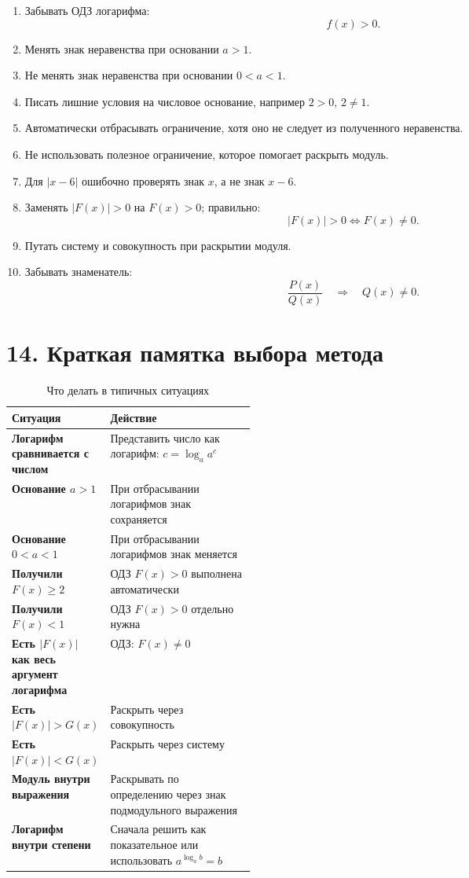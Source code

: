 \documentclass[a4paper,12pt]{article}
\newcommand{\sectionline}{\vspace{0.35em}{\color{accent}\hrule height 0.6pt}\vspace{0.65em}}
\begin{document}
\begin{enumerate}
    \item Забывать ОДЗ логарифма:
    \[
    f(x)>0.
    \]
    \item Менять знак неравенства при основании $a>1$.
    \item Не менять знак неравенства при основании $0<a<1$.
    \item Писать лишние условия на числовое основание, например $2>0$, $2\ne1$.
    \item Автоматически отбрасывать ограничение, хотя оно не следует из полученного неравенства.
    \item Не использовать полезное ограничение, которое помогает раскрыть модуль.
    \item Для $|x-6|$ ошибочно проверять знак $x$, а не знак $x-6$.
    \item Заменять $|F(x)|>0$ на $F(x)>0$; правильно:
    \[
    |F(x)|>0\Longleftrightarrow F(x)\ne0.
    \]
    \item Путать систему и совокупность при раскрытии модуля.
    \item Забывать знаменатель:
    \[
    \frac{P(x)}{Q(x)} \quad \Rightarrow \quad Q(x)\ne0.
    \]
\end{enumerate}

\section*{\textcolor{darkaccent}{14. Краткая памятка выбора метода}}
\sectionline

\begin{table}[h]
\caption{Что делать в типичных ситуациях}
\centering
\renewcommand{\arraystretch}{1.45}
\begin{tabularx}{\linewidth}{>{\bfseries}p{0.36\linewidth}X}
\toprule
Ситуация & Действие \\
\midrule
Логарифм сравнивается с числом & Представить число как логарифм: $c=\log_a a^c$ \\
Основание $a>1$ & При отбрасывании логарифмов знак сохраняется \\
Основание $0<a<1$ & При отбрасывании логарифмов знак меняется \\
Получили $F(x)\ge2$ & ОДЗ $F(x)>0$ выполнена автоматически \\
Получили $F(x)<1$ & ОДЗ $F(x)>0$ отдельно нужна \\
Есть $|F(x)|$ как весь аргумент логарифма & ОДЗ: $F(x)\ne0$ \\
Есть $|F(x)|>G(x)$ & Раскрыть через совокупность \\
Есть $|F(x)|<G(x)$ & Раскрыть через систему \\
Модуль внутри выражения & Раскрывать по определению через знак подмодульного выражения \\
Логарифм внутри степени & Сначала решить как показательное или использовать $a^{\log_a b}=b$ \\
\bottomrule
\end{tabularx}
\end{table}
\end{document}
